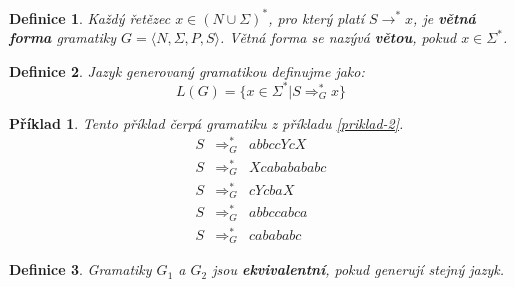 \documentclass[10pt, a4paper, titlepage]{article}
\theoremstyle{note}
\newtheorem{definice}{\textbf{Definice}}
\newtheorem{priklad}{\textbf{Příklad}}
\begin{document}
\begin{definice}
Každý řetězec $x \in (N \cup\Sigma)^{*}$, pro který platí $S \rightarrow^{*} x$, je \textbf{větná forma} gramatiky $G = \langle N, \Sigma, P, S \rangle$.
Větná forma se nazývá \textbf{větou}, pokud $x \in \Sigma^{*}$.
\end{definice}

\begin{definice}
Jazyk generovaný gramatikou definujme jako:
$$
L(G) = \lbrace x \in \Sigma^{*} | S \Rightarrow_{G}^{*} x \rbrace
$$
\end{definice}

\begin{priklad}
Tento příklad čerpá gramatiku z příkladu \ref{priklad-2}.
\begin{eqnarray*}
S &\Rightarrow_{G}^{*}& abbccYcX \\
S &\Rightarrow_{G}^{*}& Xcababababc \\
S &\Rightarrow_{G}^{*}& cYcbaX \\
S &\Rightarrow_{G}^{*}& abbccabca \\
S &\Rightarrow_{G}^{*}& cabababc
\end{eqnarray*}
\end{priklad}

\begin{definice}
Gramatiky $G_{1}$ a $G_{2}$ jsou \textbf{ekvivalentní}, pokud generují stejný jazyk.
\end{definice}
\end{document}
